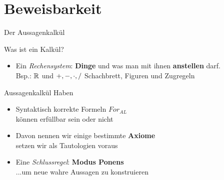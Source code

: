 \section{Beweisbarkeit}

\begin{frame}{Der Aussagenkalkül}
	\begin{block}{Was ist ein Kalkül?}
		\begin{itemize}
			\item Ein \emph{Rechensystem}: \; \textbf{Dinge} und was man mit ihnen \textbf{anstellen} darf. \\
			Bsp.: \quad $\mathbb{R}$ und $+, -, \cdot, /$ \qquad Schachbrett, Figuren und Zugregeln
		\end{itemize}
	\end{block}
	\pause
	\begin{block}{Aussagenkalkül}
		Haben
		\begin{itemize}
			\item Syntaktisch korrekte Formeln $For_{AL}$ \\
			\impl können erfüllbar sein oder nicht 
			\item Davon nennen wir einige bestimmte \textbf{Axiome} \\
			\impl setzen wir als Tautologien voraus
			\item Eine \emph{Schlussregel}: \textbf{Modus Ponens} \\
			...um neue wahre Aussagen zu konstruieren
		\end{itemize}
	\end{block}
\end{frame}

